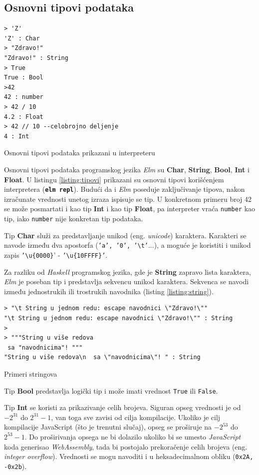 \documentclass[12pt,oneside]{memoir}
\begin{document}
\subsection{Osnovni tipovi podataka}
\begin{listing}[h]
\begin{verbatim}
> 'Z'
'Z' : Char
> "Zdravo!"
"Zdravo!" : String
> True
True : Bool
>42
42 : number
> 42 / 10 
4.2 : Float
> 42 // 10 --celobrojno deljenje
4 : Int
\end{verbatim}
\caption{Osnovni tipovi podataka prikazani u interpreteru}
\label{listing:tipovi}
\end{listing}
Osnovni tipovi podataka programskog jezika \emph{Elm} su \textbf{Char}, \textbf{String}, \textbf{Bool},
\textbf{Int} i \textbf{Float}. U listingu \ref{listing:tipovi} prikazani su osnovni
tipovi korišćenjem interpretera (\texttt{\textbf{elm repl}}). Budući da i \emph{Elm} poseduje zaključivanje tipova, nakon
izračunate vrednosti unetog izraza ispisuje se tip. U konkretnom primeru broj 42 se
može posmartati i kao tip \textbf{Int} i kao tip \textbf{Float}, pa interpreter vraća
\texttt{number} kao tip, iako \texttt{number} nije konkretan tip podataka.


Tip \textbf{Char} služi za predstavljanje unikod (eng. \emph{unicode}) karaktera.
Karakteri se navode između dva apostorfa (\texttt{'a', '0', '\textbackslash t'}...), a
moguće je koristiti i unikod zapis  \texttt{'\textbackslash u\{0000\}}' -
\texttt{'\textbackslash u\{10FFFF\}'}.

Za razliku od \emph{Haskell} programskog jezika, gde je \textbf{String} zapravo lista karaktera, \emph{Elm} je
poseban tip i predstavlja sekvencu unikod karaktera. Sekvenca se navodi između
jednostrukih ili trostrukih navodnika (listing \ref{listing:string}).

\begin{listing}[ht]
\begin{verbatim}
> "\t String u jednom redu: escape navodnici \"Zdravo!\""
"\t String u jednom redu: escape navodnici \"Zdravo!\"" : String
>
> """String u više redova
 sa "navodnicima"! """
"String u više redova\n  sa \"navodnicima\"! " : String
\end{verbatim}
\caption{Primeri stringova}
\label{listing:string}
\end{listing}

Tip \textbf{Bool} predstavlja logički tip i može imati vrednost \texttt{True} ili
\texttt{False}. 

Tip \textbf{Int} se koristi za prikazivanje celih brojeva. Siguran opseg vrednosti je
od \(-2^{31}\) do \(2^{31} - 1\), van toga sve zavisi od cilja kompilacije. Ukoliko je
cilj kompilacije JavaScript (što je trenutni slučaj), opseg se proširuje na \(-2^{53}\) do
\(2^{53} - 1\). Do proširivanja opsega ne bi dolazilo ukoliko bi se
umesto \emph{JavaScript} koda generisao \emph{WebAssembly}, tada bi postojalo prekoračenje celih
brojeva (eng. \emph{integer overflow}). Vrednosti se mogu navoditi i u heksadecimalnom
obliku (\texttt{0x2A, -0x2b}).
\end{document}
